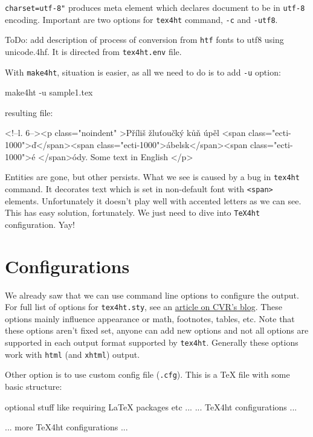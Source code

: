 \texttt{charset=utf-8"} produces meta element which declares document to
be in \texttt{utf-8} encoding. Important are two options for
\texttt{tex4ht} command, \texttt{-c} and \texttt{-utf8}.

ToDo: add description of process of conversion from \texttt{htf} fonts
to utf8 using unicode.4hf. It is directed from \texttt{tex4ht.env} file.

With \texttt{make4ht}, situation is easier, as all we need to do is to
add \texttt{-u} option:

\begin{shellcommand}
make4ht -u sample1.tex
\end{shellcommand}

resulting file:

\begin{htmlsource}
<!--l. 6--><p class="noindent" >Příliš žluťoučký kůň úpěl <span 
class="ecti-1000">ď</span><span 
class="ecti-1000">ábelsk</span><span 
class="ecti-1000">é </span>ódy. Some text in English
</p> 
\end{htmlsource}

Entities are gone, but other persists. What we see is caused by a bug in
\texttt{tex4ht} command. It decorates text which is set in non-default
font with \texttt{\textless{}span\textgreater{}} elements. Unfortunately
it doesn't play well with accented letters as we can see. This has easy
solution, fortunately. We just need to dive into \texttt{TeX4ht}
configuration. Yay!

\hypertarget{configurations}{%
\section{Configurations}\label{configurations}}

We already saw that we can use command line options to configure the
output. For full list of options for \texttt{tex4ht.sty}, see an
\href{http://www.cvr.cc/?p=504}{article on CVR's blog}. These options
mainly influence appearance or math, footnotes, tables, etc. Note that
these options aren't fixed set, anyone can add new options and not all
options are supported in each output format supported by
\texttt{tex4ht}. Generally these options work with \texttt{html} (and
\texttt{xhtml}) output.

Other option is to use custom config file (\texttt{.cfg}). This is a TeX
file with some basic structure:

\begin{texsource}
 optional stuff like requiring LaTeX packages etc
 ...
 ...
 TeX4ht configurations
 ...
  
 ...
 more TeX4ht configurations
 ...
 \EndPreamble
\end{texsource}

